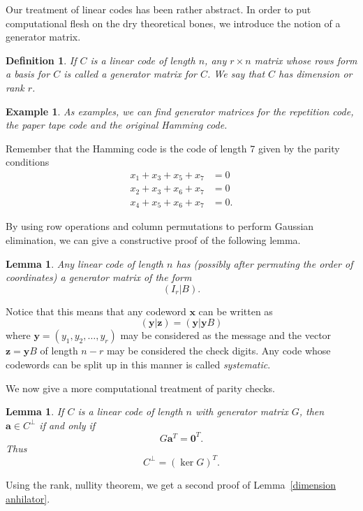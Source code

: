 \documentclass[12pt,a4paper]{article}
\theoremstyle{plain}
\newtheorem{lemma}[theorem]{Lemma}
\newtheorem{definition}[theorem]{Definition}
\newtheorem{example}[theorem]{Example}
\theoremstyle{definition}
\begin{document}
Our treatment of linear codes has
been rather abstract. In order
to put computational flesh on
the  dry theoretical bones,
we introduce the notion of
a generator matrix.
\begin{definition} If $C$ is a linear
code of length $n$, any  $r\times n$
matrix whose rows form a basis
for $C$ is called a \emph{generator matrix}
for $C$. We say that $C$ has \emph{dimension}
or \emph{rank} $r$.
\end{definition}
\begin{example} As examples, we can find
generator matrices for the repetition code,
the paper tape code and the original Hamming code.
\end{example}
Remember that the Hamming code is the
code of length 7 given by the parity conditions
\begin{align*}
x_{1}+x_{3}+x_{5}+x_{7}&=0\\
x_{2}+x_{3}+x_{6}+x_{7}&=0\\
x_{4}+x_{5}+x_{6}+x_{7}&=0.
\end{align*}

By using row operations and column permutations
to perform Gaussian elimination, we
can give a constructive proof of
the following lemma.
\begin{lemma} Any linear code of length $n$ has
(possibly after permuting the order of coordinates)
a generator matrix of the form
\[(I_{r}|B).\]
\end{lemma}
Notice that this means that any codeword ${\mathbf x}$
can be written as
\[({\mathbf y}|{\mathbf z})=({\mathbf y}|{\mathbf y}B)\]
where ${\mathbf y}=(y_{1},y_{2},\dots,y_{r})$ may
be considered as the message and the vector
${\mathbf z}={\mathbf y}B$ of length $n-r$ may
be considered the check digits. Any code whose codewords
can be split up in this manner is called \emph{systematic}.

We now give a more computational treatment  of parity checks.
\begin{lemma}\label{kernel} If $C$ is a linear code
of length $n$
with generator matrix $G$, then ${\mathbf a}\in C^{\perp}$
if and only if
\[G{\mathbf a}^{T}={\boldsymbol  0}^{T}.\]
Thus
\[C^{\perp}=(\ker G)^{T}.\]
\end{lemma}
\noindent
Using the rank, nullity theorem,
we get a second proof of Lemma~\ref{dimension anhilator}.
\end{document}
